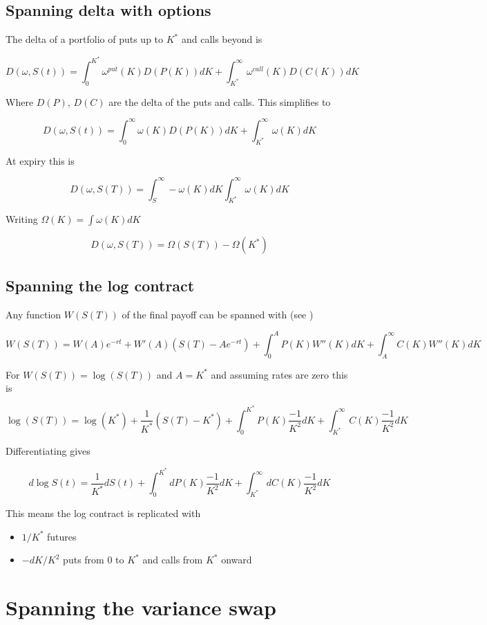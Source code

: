 \documentclass[12pt]{article}
\begin{document}
\subsection*{Spanning delta with options}

The delta of a portfolio of puts up to $K^*$ and calls beyond is 

\[  D(\omega, S(t)) = \int_{0}^{K^*} \omega^{put}(K) D(P(K))dK  + \int_{K^*}^\infty \omega^{call}(K) D(C(K))dK \]

Where $D(P)$, $D(C)$ are the delta of the puts and calls. This simplifies to 

\[  D(\omega , S(t)) = \int_{0}^{\infty} \omega(K) D(P(K))dK  + \int_{K^*}^{\infty}\omega(K)dK \]

At expiry this is 

\[  D(\omega , S(T)) = \int_{S}^{\infty} -\omega(K) dK  \int_{K^*}^{\infty}\omega(K)dK \]

Writing $\Omega(K) = \int \omega(K)dK$

\[  D(\omega , S(T)) = \Omega(S(T))-\Omega(K^*)\]

\subsection*{Spanning the log contract}

Any function $W(S(T))$ of the final payoff can be spanned with (see \cite{JarrowGreen87})

\[W(S(T)) = W(A)e^{-rt} + W'(A)(S(T)-Ae^{-rt}) + \int_0^A P(K)W''(K)dK + \int_A^\infty C(K)W''(K)dK\]

For $W(S(T))=\log(S(T))$ and $A=K^*$ and assuming rates are zero this is 

\[ \log(S(T)) = \log(K^*) + \frac{1}{K^*}(S(T)-K^*) + \int_0^{K^*}P(K) \frac{-1}{K^2}dK + \int_{K^*}^{\infty}C(K) \frac{-1}{K^2}dK  \]

Differentiating gives 

\[d \log S(t) = \frac{1}{K^*}dS(t) + \int_0^{K^*}d P(K) \frac{-1}{K^2}dK + \int_{K^*}^{\infty}dC(K) \frac{-1}{K^2}dK  \]

This means the log contract is replicated with
\begin{itemize}
    \item $1/K^*$ futures
    \item $-dK/K^2$ puts from 0 to $K^*$ and calls from $K^*$ onward
\end{itemize}

\section*{Spanning the variance swap}
\end{document}
